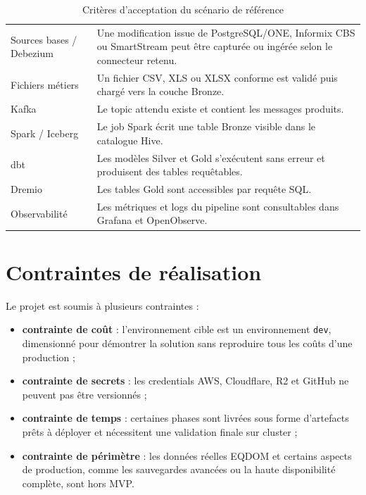 \begin{table}[H]
\centering
\caption{Critères d'acceptation du scénario de référence}
\label{tab:acceptation}
\PFETableSetup
{}
\begin{tabularx}{\textwidth}{|p{}|Y|}
\hline
{}
 &  \\
\hline
Sources bases / Debezium & Une modification issue de PostgreSQL/ONE, Informix CBS ou SmartStream peut être capturée ou ingérée selon le connecteur retenu. \\
\hline
Fichiers métiers & Un fichier CSV, XLS ou XLSX conforme est validé puis chargé vers la couche Bronze. \\
\hline
Kafka & Le topic attendu existe et contient les messages produits. \\
\hline
Spark / Iceberg & Le job Spark écrit une table Bronze visible dans le catalogue Hive. \\
\hline
dbt & Les modèles Silver et Gold s'exécutent sans erreur et produisent des tables requêtables. \\
\hline
Dremio & Les tables Gold sont accessibles par requête SQL. \\
\hline
Observabilité & Les métriques et logs du pipeline sont consultables dans Grafana et OpenObserve. \\
\hline
\end{tabularx}
\end{table}

\section{Contraintes de réalisation}

Le projet est soumis à plusieurs contraintes :
\begin{itemize}
    \item \textbf{contrainte de coût} : l'environnement cible est un environnement \texttt{dev}, dimensionné pour démontrer la solution sans reproduire tous les coûts d'une production ;
    \item \textbf{contrainte de secrets} : les credentials AWS, Cloudflare, R2 et GitHub ne peuvent pas être versionnés ;
    \item \textbf{contrainte de temps} : certaines phases sont livrées sous forme d'artefacts prêts à déployer et nécessitent une validation finale sur cluster ;
    \item \textbf{contrainte de périmètre} : les données réelles EQDOM et certains aspects de production, comme les sauvegardes avancées ou la haute disponibilité complète, sont hors MVP.
\end{itemize}

